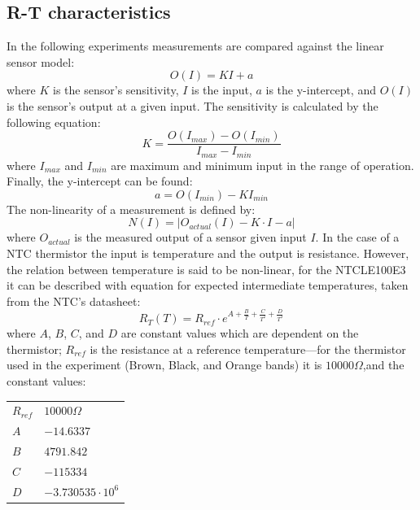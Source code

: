 \documentclass[a4,11pt]{article}
\begin{document}
\subsection{R-T characteristics}
In the following experiments measurements are compared against the linear sensor model:
\begin{equation}
\label{eq:model}
O(I)=KI+a
\end{equation}
where $K$ is the sensor's sensitivity, $I$ is the input, $a$ is the y-intercept, and $O(I)$ is the sensor's output at a given input. The sensitivity is calculated by the following equation:
\begin{equation}
\label{eq:sensitivity}
K=\frac{O(I_{max})-O(I_{min})}{I_{max}-I_{min}}
\end{equation}
where $I_{max}$ and $I_{min}$ are maximum and minimum input in the range of operation. Finally, the  y-intercept can be found:
\begin{equation}
\label{eq:intercept}
a=O(I_{min})-KI_{min}
\end{equation}
The non-linearity of a measurement is defined by:
\begin{equation}
\label{eq:non-linearity}
N(I)=\lvert O_{actual}(I)-K\cdot I-a\lvert
\end{equation}
where $O_{actual}$ is the measured output of a sensor given input $I$.
In the case of a NTC thermistor the input is temperature and the output is resistance. However, the relation between temperature is said to be non-linear, for the NTCLE100E3 it can be described with equation for expected intermediate temperatures, taken from the NTC's datasheet:
\begin{equation}
\label{eq:datasheet}
R_T(T)=R_{ref}\cdot e^{A+\frac{B}{T}+\frac{C}{T^2}+\frac{D}{T^3}}
\end{equation}
where $A$, $B$, $C$, and $D$ are constant values which are dependent on the thermistor; $R_{ref}$ is the resistance at a reference temperature---for the thermistor used in the experiment (Brown, Black, and Orange bands) it is $10000\Omega$,and the constant values:
\begin{center}
	\begin{tabular}{ll}
		\hline 
		$R_{ref}$  &  $10000\Omega$  \\
		$A$  &  $-14.6337$  \\
		$B$\footnotemark  &  $4791.842$  \\
		$C$  &  $-115334$  \\
		$D$  &  $-3.730535\cdot10^6$  \\
		\hline
	\end{tabular}
\end{center}
\end{document}
